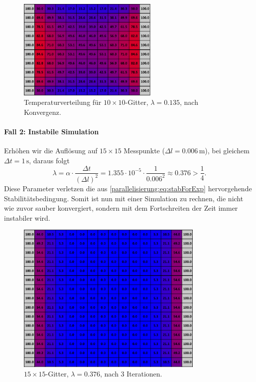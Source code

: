 \begin{figure}[htbp]
	\centering
	\includegraphics[width=0.6\textwidth]{papers/parallelisierung/images/simulation_10x10_0.135.pdf}
	\caption{Temperaturverteilung für \(10\times 10\)-Gitter, \(\lambda = 0.135\), nach Konvergenz.}
	\label{parallelisierung:fig:simulation_10x10_0.135}
\end{figure}

\paragraph{Fall 2: Instabile Simulation}  
Erhöhen wir die Auflösung auf \(15\times 15\) Messpunkte (\(\Delta l = 0.006\,\mathrm{m}\)), bei gleichem \(\Delta t = 1\,\mathrm{s}\), daraus folgt
\[
\lambda =
\alpha \cdot \frac{\Delta t}{(\Delta l)^2}
=
1.355\cdot 10^{-5} \cdot \frac{1}{0.006^2}
\approx 0.376 > \frac14.
\]
Diese Parameter verletzen die aus \eqref{parallelisierung:eq:stabForExp} hervorgehende Stabilitätsbedingung. Somit ist nun mit einer Simulation zu rechnen, die nicht wie zuvor sauber konvergiert, sondern mit dem Fortschreiten der Zeit immer instabiler wird.

\begin{figure}[htbp]
	\centering
	\includegraphics[width=0.8\textwidth]{papers/parallelisierung/images/simulation_15x15_0.376_3it.pdf}
	\caption{\(15\times 15\)-Gitter, \(\lambda = 0.376\), nach 3 Iterationen.}
	\label{parallelisierung:fig:simulation_15x15_0.376_3it}
\end{figure}

